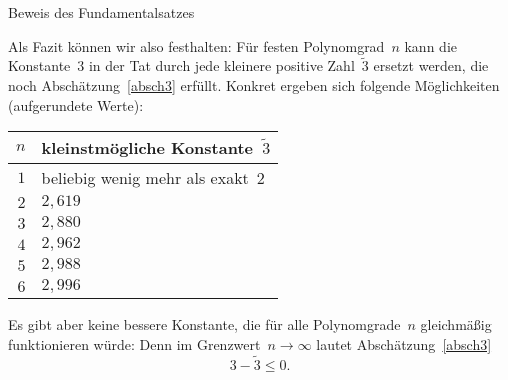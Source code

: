 \documentclass{algblatt}
\begin{document}
\begin{aufgabe}{Beweis des Fundamentalsatzes}
\begin{loesung}
Als Fazit können wir also festhalten: Für festen Polynomgrad~$n$ kann die
Konstante~$3$ in der Tat durch jede kleinere positive Zahl~$\widetilde 3$
ersetzt werden, die noch Abschätzung~\eqref{absch3} erfüllt. Konkret ergeben
sich folgende Möglichkeiten (aufgerundete Werte):
\begin{center}\begin{tabular}{r|l}
  $n$ & kleinstmögliche Konstante~$\widetilde 3$ \\ \hline
  $1$ & beliebig wenig mehr als exakt~$2$ \\
  $2$ & $2{,}619$ \\
  $3$ & $2{,}880$ \\
  $4$ & $2{,}962$ \\
  $5$ & $2{,}988$ \\
  $6$ & $2{,}996$
\end{tabular}\end{center}
Es gibt aber keine bessere Konstante, die für alle Polynomgrade~$n$ gleichmäßig
funktionieren würde: Denn im Grenzwert~$n \to \infty$ lautet
Abschätzung~\eqref{absch3}
\[ 3 - \widetilde 3 \leq 0. \]
\end{loesung}
\end{aufgabe}
\end{document}
